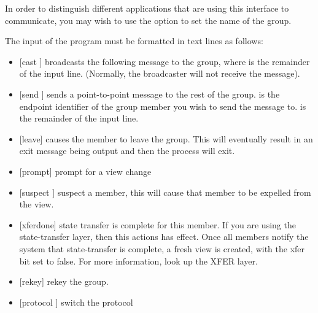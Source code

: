 In order to distinguish different applications that are using this interface to
communicate, you may wish to use the  option to set the
name of the group.

The input of the program must be formatted in text lines as follows:
\begin{itemize}
\item
{[cast ]} broadcasts the following message to the group, where
 is the remainder of the input line.  (Normally, the broadcaster
will not receive the message).
\item
{[send  ]} sends a point-to-point message to the rest of the
group.   is the endpoint identifier of the group member you wish to send
the message to.   is the remainder of the input line.
\item
{[leave]} causes the member to leave the group.  This will eventually result in
an exit message being output and then the  process will exit.
\item
{[prompt]} prompt for a view change
\item
{[suspect ]} suspect a member, this will cause that
member to be expelled from the view.
\item
{[xferdone]} state transfer is complete for this member. If you are
  using the state-transfer layer, then this actions has effect. Once
all members notify the system that state-transfer is complete, a fresh
view is created, with the xfer bit set to false. For more information,
look up the XFER layer. 
\item
{[rekey]} rekey the group.
\item
{[protocol  ]} switch the protocol
\end{itemize}

